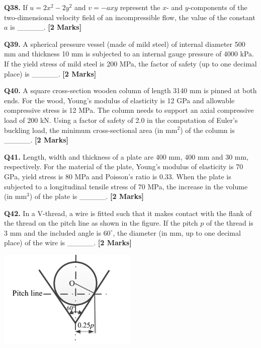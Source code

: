 \documentclass[11pt]{article}
\newcommand{\questionb}[2]{
    \noindent\textbf{Q#2.} #1 \hfill \textbf{[2 Marks]}
}
\begin{document}
\questionb{If \( u = 2x^2 - 2y^2 \) and \( v = -axy \) represent the \( x \)- and \( y \)-components of the two-dimensional velocity field of an incompressible flow, the value of the constant \( a \) is \_\_\_\_\_.}{38}
\vspace{0.5cm}

\questionb{A spherical pressure vessel (made of mild steel) of internal diameter 500 mm and thickness 10 mm is subjected to an internal gauge pressure of 4000 kPa. If the yield stress of mild steel is 200 MPa, the factor of safety (up to one decimal place) is \_\_\_\_\_.}{39}
\vspace{0.5cm}

\questionb{A square cross-section wooden column of length 3140 mm is pinned at both ends. For the wood, Young’s modulus of elasticity is 12 GPa and allowable compressive stress is 12 MPa. The column needs to support an axial compressive load of 200 kN. Using a factor of safety of 2.0 in the computation of Euler’s buckling load, the minimum cross-sectional area (in mm\(^2\)) of the column is \_\_\_\_\_.}{40}
\vspace{0.5cm}

\questionb{Length, width and thickness of a plate are 400 mm, 400 mm and 30 mm, respectively. For the material of the plate, Young’s modulus of elasticity is 70 GPa, yield stress is 80 MPa and Poisson’s ratio is 0.33. When the plate is subjected to a longitudinal tensile stress of 70 MPa, the increase in the volume (in mm\(^3\)) of the plate is \_\_\_\_\_.}{41}
\vspace{0.5cm}

\questionb{In a V-thread, a wire is fitted such that it makes contact with the flank of the thread on the pitch line as shown in the figure. If the pitch \( p \) of the thread is 3 mm and the included angle is \( 60^\circ \), the diameter (in mm, up to one decimal place) of the wire is \_\_\_\_\_.}{42}
\begin{center}
\includegraphics[width=0.5\textwidth]{figures/42.png}
\end{center}
\vspace{0.5cm}
\end{document}
